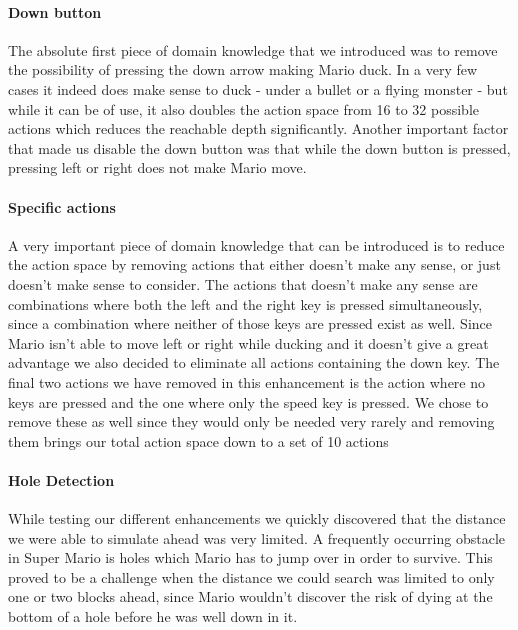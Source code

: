 \documentclass[10pt,a4paper]{article}
\begin{document}
\paragraph{Down button} %
The absolute first piece of domain knowledge that we introduced was to remove the possibility of pressing the down arrow making Mario duck. In a very few cases it indeed does make sense to duck - under a bullet or a flying monster - but while it can be of use, it also doubles the action space from 16 to 32 possible actions which reduces the reachable depth significantly.
Another important factor that made us disable the down button was that while the down button is pressed, pressing left or right does not make Mario move.

\paragraph{Specific actions}
A very important piece of domain knowledge that can be introduced is to reduce the action space by removing actions that either doesn't make any sense, or just doesn't make sense to consider.
The actions that doesn't make any sense are combinations where both the left and the right key is pressed simultaneously, since a combination where neither of those keys are pressed exist as well.
Since Mario isn't able to move left or right while ducking and it doesn't give a great advantage we also decided to eliminate all actions containing the down key.
The final two actions we have removed in this enhancement is the action where no keys are pressed and the one where only the speed key is pressed. We chose to remove these as well since they would only be needed very rarely and removing them brings our total action space down to a set of 10 actions

\paragraph{Hole Detection}
\label{hole}
While testing our different enhancements we quickly discovered that the distance we were able to simulate ahead was very limited. A frequently occurring obstacle in Super Mario is holes which Mario has to jump over in order to survive. This proved to be a challenge when the distance we could search was limited to only one or two blocks ahead, since Mario wouldn't discover the risk of dying at the bottom of a hole before he was well down in it.
\end{document}
